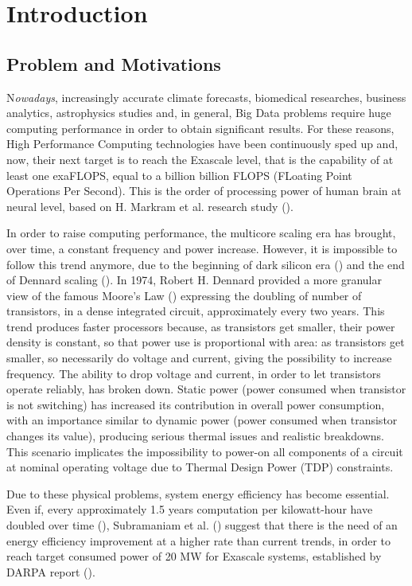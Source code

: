 \chapter{Introduction}

\section{Problem and Motivations}

\lettrine{N}{}\textit{owadays}, increasingly accurate climate forecasts, biomedical researches, business analytics, astrophysics studies and, in general, Big Data problems require huge computing performance in order to obtain significant results. For these reasons, High Performance Computing technologies have been continuously sped up and, now, their next target is to reach the Exascale level, that is the capability of at least one exaFLOPS, equal to a billion billion FLOPS (FLoating Point Operations Per Second). This is the order of processing power of human brain at neural level, based on H. Markram et al. research study (\cite{markram2011introducing}).

In order to raise computing performance, the multicore scaling era has brought, over time, a constant frequency and power increase. However, it is impossible to follow this trend anymore, due to the beginning of dark silicon era (\cite{esmaeilzadeh2011dark}) and the end of Dennard scaling (\cite{dennard1974design}). In 1974, Robert H. Dennard provided a more granular view of the famous Moore's Law (\cite{moore1998cramming}) expressing the doubling of number of transistors, in a dense integrated circuit, approximately every two years. This trend produces faster processors because, as transistors get smaller, their power density is constant, so that power use is proportional with area: as transistors get smaller, so necessarily do voltage and current, giving the possibility to increase frequency. The ability to drop voltage and current, in order to let transistors operate reliably, has broken down. Static power (power consumed when transistor is not switching) has increased its contribution in overall power consumption, with an importance similar to dynamic power (power consumed when transistor changes its value), producing serious thermal issues and realistic breakdowns. This scenario implicates the impossibility to power-on all components of a circuit at nominal operating voltage due to Thermal Design Power (TDP) constraints.

Due to these physical problems, system energy efficiency has become essential. Even if, every approximately 1.5 years computation per kilowatt-hour have doubled over time (\cite{koomey2011implications}), Subramaniam et al. (\cite{subramaniam2013trends}) suggest that there is the need of an energy efficiency improvement at a higher rate than current trends, in order to reach target consumed power of 20 MW for Exascale systems, established by DARPA report (\cite{bergman2008exascale}).

